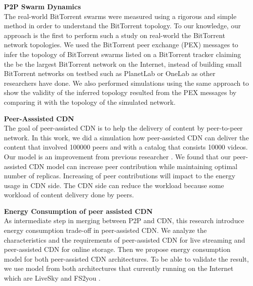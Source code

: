 \textbf{P2P Swarm Dynamics}\\
The real-world BitTorrent swarms were measured using a rigorous and simple method in order to understand the BitTorrent topology. 
To our knowledge, our approach is the first to perform such a study on real-world the BitTorrent network topologies. 
We used the BitTorrent peer exchange (PEX) messages to infer the topology of BitTorrent swarms listed on a BitTorrent tracker claiming the be the largest BitTorrent network on the Internet, instead of building small BitTorrent networks on testbed such as PlanetLab or OneLab as other researchers have done.
We also performed simulations using the same approach to show the validity of the inferred topology resulted from the PEX messages by comparing it with the topology of the simulated network.

\textbf{Peer-Asssisted CDN}\\
The goal of peer-assisted CDN is to help the delivery of content by peer-to-peer network.  
In this work, we did a simulation how peer-assisted CDN can deliver the content that involved 100000 peers and with a catalog that consists 10000 videos.
Our model is an improvement from previous researcher \cite{1613869}.
We found that our peer-assisted CDN model can increase peer contribution while maintaining optimal number of replicas.
Increasing of peer contributions will impact to the energy usage in CDN side. 
The CDN side can reduce the workload because some workload of content delivery done by peers.


\textbf{Energy Consumption of peer assisted CDN}\\
As intermediate step in merging between P2P and CDN, this research introduce energy consumption trade-off in peer-assisted CDN. 
We analyze the characteristics and the requirements of peer-assisted CDN for live streaming and peer-assisted CDN for online storage.
Then we propose energy consumption model for both peer-assisted CDN architectures.
To be able to validate the result, we use model from both architectures that currently running on the Internet which are LiveSky \cite{Yin:2010:LEC:1823746.1823750} and FS2you \cite{fs2you}.
 



